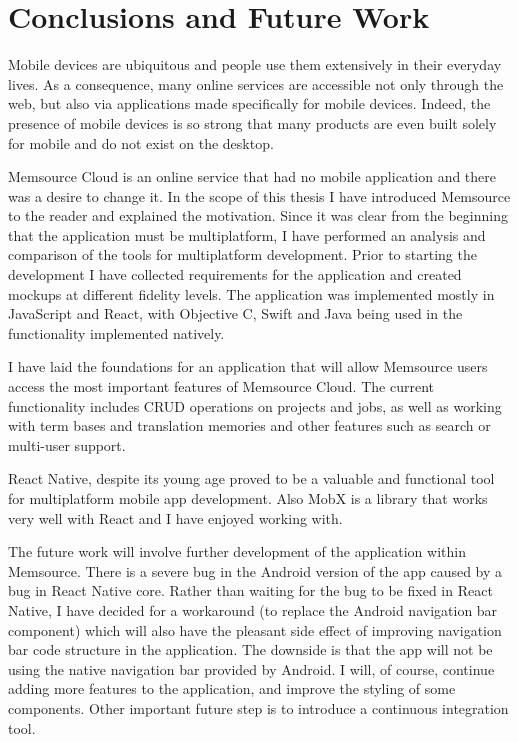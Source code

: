 \chapter{Conclusions and Future Work}

Mobile devices are ubiquitous and people use them extensively in their everyday lives. As a consequence, many online services are accessible not only through the web, but also via applications made specifically for mobile devices. Indeed, the presence of mobile devices is so strong that many products are even built solely for mobile and do not exist on the desktop.

Memsource Cloud is an online service that had no mobile application and there was a desire to change it. In the scope of this thesis I have introduced Memsource to the reader and explained the motivation. Since it was clear from the beginning that the application must be multiplatform, I have performed an analysis and comparison of the tools for multiplatform development. Prior to starting the development I have collected requirements for the application and created mockups at different fidelity levels. The application was implemented mostly in JavaScript and React, with Objective C, Swift and Java being used in the functionality implemented natively. 


I have laid the foundations for an application that will allow Memsource users access the most important features of Memsource Cloud. The current functionality includes CRUD operations on projects and jobs, as well as working with term bases and translation memories and other features such as search or multi-user support.

React Native, despite its young age proved to be a valuable and functional tool for multiplatform mobile app development. Also MobX is a library that works very well with React and I have enjoyed working with.


The future work will involve further development of the application within Memsource. There is a severe bug in the Android version of the app caused by a bug in React Native core. Rather than waiting for the bug to be fixed in React Native, I have decided for a workaround (to replace the Android navigation bar component) which will also have the pleasant side effect of improving navigation bar code structure in the application. The downside is that the app will not be using the native navigation bar provided by Android. I will, of course, continue adding more features to the application, and improve the styling of some components. Other important future step is to introduce a continuous integration tool.